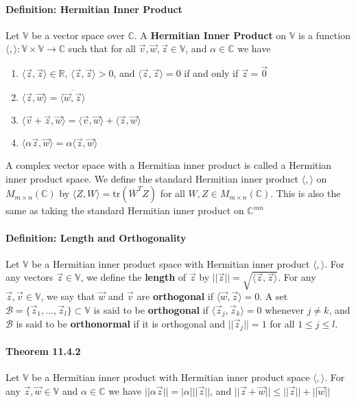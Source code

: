 \documentclass[10pt,letter]{article}
\begin{document}
\paragraph{Definition: Hermitian Inner Product}
Let $\mathbb{V}$ be a vector space over $\mathbb{C}$. A \textbf{Hermitian Inner Product} on $\mathbb{V}$ is a function $\langle,\rangle:\mathbb{V}\times\mathbb{V}\rightarrow \mathbb{C}$ such that for all $\vec{v},\vec{w},\vec{z}\in\mathbb{V}$, and $\alpha\in\mathbb{C}$ we have 
\begin{enumerate}
    \item $\langle\vec{z},\vec{z}\rangle\in\mathbb{R}$, $\langle\vec{z},\vec{z}\rangle>0$, and $\langle\vec{z},\vec{z}\rangle=0$ if and only if $\vec{z}=\vec{0}$
    \item $\langle\vec{z},\vec{w}\rangle=\overline{\langle\vec{w},\vec{z}\rangle}$ 
    \item $\langle\vec{v}+\vec{z},\vec{w}\rangle=\langle\vec{v},\vec{w}\rangle+\langle\vec{z},\vec{w}\rangle$
    \item $\langle\alpha\vec{z},\vec{w}\rangle=\alpha\langle\vec{z},\vec{w}\rangle$
\end{enumerate} 
A complex vector space with a Hermitian inner product is called a Hermitian inner product space. We define the standard Hermitian inner product $\langle,\rangle$ on $M_{m\times n}(\mathbb{C})$ by $\langle Z,W\rangle =\text{tr}(\overline{W}^TZ)$ for all $W,Z\in M_{m\times n}(\mathbb{C})$. This is also the same as taking the standard Hermitian inner product on $\mathbb{C}^{mn}$ 

\paragraph{Definition: Length and Orthogonality}
Let $\mathbb{V}$ be a Hermitian inner product space with Hermitian inner product $\langle,\rangle$. For any vectors $\vec{z}\in\mathbb{V}$, we define the \textbf{length} of $\vec{z}$ by $||\vec{z}||=\sqrt{\langle\vec{z},\vec{z}\rangle}$. For any $\vec{z},\vec{v}\in\mathbb{V}$, we say that $\vec{w}$ and $\vec{v}$ are \textbf{orthogonal} if $\langle\vec{w},\vec{z}\rangle=0$. A set $\mathcal{B}=\{\vec{z}_1,\ldots,\vec{z}_l\}\subset\mathbb{V}$ is said to be \textbf{orthogonal} if $\langle\vec{z}_j,\vec{z}_k\rangle=0$ whenever $j\neq k$, and $\mathcal{B}$ is said to be \textbf{orthonormal} if it is orthogonal and $||\vec{z}_j||=1$ for all $1\leq j\leq l$. 
\paragraph{Theorem 11.4.2}
Let $\mathbb{V}$ be a Hermitian inner product with Hermitian inner product space $\langle,\rangle$. For any $\vec{z},\vec{w}\in\mathbb{V}$ and $\alpha\in\mathbb{C}$ we have $||\alpha\vec{z}||=|\alpha|||\vec{z}||$, and $||\vec{z}+\vec{w}||\leq||\vec{z}||+||\vec{w}||$
\end{document}
